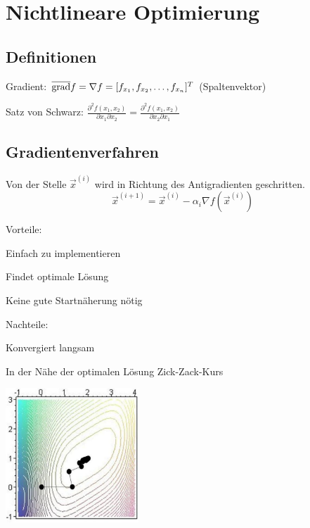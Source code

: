 \section{Nichtlineare Optimierung}
\subsection{Definitionen}
  Gradient: $\overline{\operatorname{grad}} f = \nabla f = [f_{x_1}, f_{x_2}, \ldots, f_{x_n} ]^T$ (Spaltenvektor)
  
  Satz von Schwarz: $\frac{\partial^2 f(x_1, x_2)}{\partial x_1 \partial x_2} = \frac{\partial^2 f(x_1, x_2)}{\partial x_2 \partial x_1}$

\subsection{Gradientenverfahren}
  \begin{minipage}{14cm}
    Von der Stelle $\vec{x}^{(i)}$ wird in Richtung des Antigradienten geschritten. 
    $$\vec{x}^{(i+1)} = \vec{x}^{(i)} - \alpha_i \nabla f(\vec{x}^{(i)})$$
    
    Vorteile:
    \begin{liste}
      \item Einfach zu implementieren
      \item Findet optimale Lösung
      \item Keine gute Startnäherung nötig
    \end{liste}
    
    Nachteile:
    \begin{liste}
      \item Konvergiert langsam
      \item In der Nähe der optimalen Lösung Zick-Zack-Kurs
    \end{liste}
  \end{minipage}
  \begin{minipage}{5cm}
    \includegraphics[width=5cm]{./Content/NonLinearOptimization/gradient-descent}
  \end{minipage}
  
